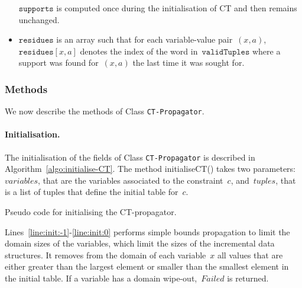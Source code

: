 \documentclass[a4paper,11pt]{article}
\newcommand{\Algoref}[1]{Algorithm~\ref{#1}}
\newcommand{\Linesref}[2]{Lines~\ref{#1}-\ref{#2}}
\newcommand{\CurrTable}{\texttt{validTuples}}
\newcommand{\LastSizes}{\texttt{lastSize}}
\newcommand{\Supports}{\texttt{supports}}
\newcommand{\Residues}{\texttt{residues}}
\newcommand{\localvar}[1]{\mathit{#1}}
\numberwithin{equation}{section}
\begin{document}
\begin{itemize}
    $\Supports$ is computed once during the initialisation of CT and then
    remains unchanged.
    

  \item $\Residues$ is an array such that for each variable-value pair~$(x,a)$,
    $\Residues[x,a]$ denotes the index of the word in~$\CurrTable$ where a support
    was found for~$(x,a)$ the last time it was sought for.

\end{itemize}

\subsubsection{Methods}

We now describe the methods of Class \texttt{CT-Propagator}.

\paragraph{Initialisation.}
The initialisation of the fields of Class \texttt{CT-Propagator} is described in
\Algoref{algo:initialise-CT}. The method initialiseCT() takes two parameters:
$\localvar{variables}$, that are the variables associated to the constraint~$c$,
and~$\localvar{tuples}$, that is a list of tuples that define the initial table for~$c$.

\begin{algorithm}[H]
  \begin{algorithmic}[1]  %
    
  \end{algorithmic}
  \caption{Pseudo code for initialising the CT-propagator.}
  \label{algo:initialise-CT}
\end{algorithm}

\Linesref{line:init:-1}{line:init:0} performs simple bounds
  propagation to limit the domain sizes of the variables,
  which limit the sizes of the incremental data structures.
  It removes
  from the domain of each variable~$x$ all values that are either greater 
  than the largest element or smaller than the smallest element in the
  initial table. If a variable has a domain wipe-out,~$Failed$ is returned.
\end{document}
